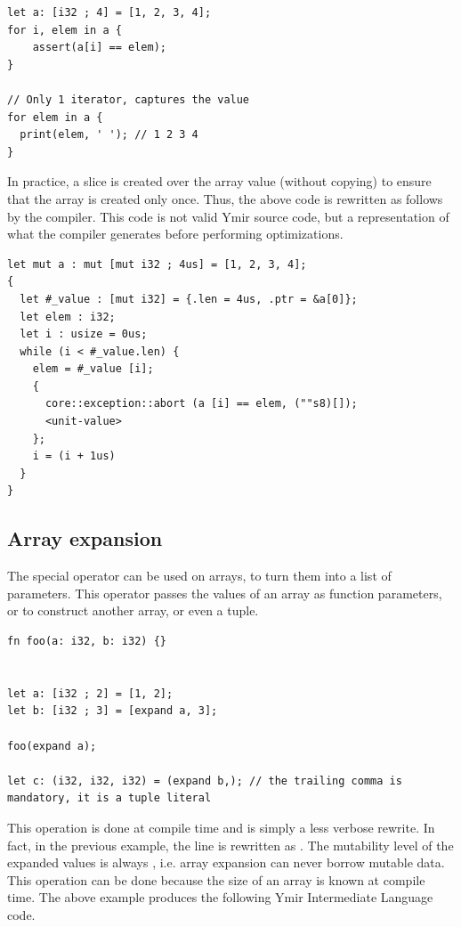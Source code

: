 \begin{lstlisting}[style=coloredverbatim]
let a: [i32 ; 4] = [1, 2, 3, 4];
for i, elem in a {
    assert(a[i] == elem);
}

// Only 1 iterator, captures the value
for elem in a {
  print(elem, ' '); // 1 2 3 4
}
\end{lstlisting}

In practice, a slice is created over the array value (without copying) to ensure
that the array is created only once. Thus, the above code is rewritten as
follows by the compiler. This code is not valid Ymir source code, but a
representation of what the compiler generates before performing optimizations.

\begin{lstlisting}[style=myilVerb]
let mut a : mut [mut i32 ; 4us] = [1, 2, 3, 4];
{
  let #_value : [mut i32] = {.len = 4us, .ptr = &a[0]};
  let elem : i32;
  let i : usize = 0us;
  while (i < #_value.len) {
    elem = #_value [i];
    {
      core::exception::abort (a [i] == elem, (""s8)[]);
      <unit-value>
    };
    i = (i + 1us)
  }
}
\end{lstlisting}


\subsection{Array expansion}

The special operator  can be used on arrays, to turn them into a
list of parameters. This operator passes the values of an array as
function parameters, or to construct another array, or even a tuple.

\begin{lstlisting}[style=coloredverbatim]
fn foo(a: i32, b: i32) {}


let a: [i32 ; 2] = [1, 2];
let b: [i32 ; 3] = [expand a, 3];

foo(expand a);

let c: (i32, i32, i32) = (expand b,); // the trailing comma is mandatory, it is a tuple literal
\end{lstlisting}

This operation is done at compile time and is simply a less verbose rewrite. In
fact, in the previous example, the line  is rewritten as
. The mutability level of the expanded values is
always , i.e. array expansion can never borrow mutable data. This
operation can be done because the size of an array is known at compile time. The
above example produces the following Ymir Intermediate Language code.

